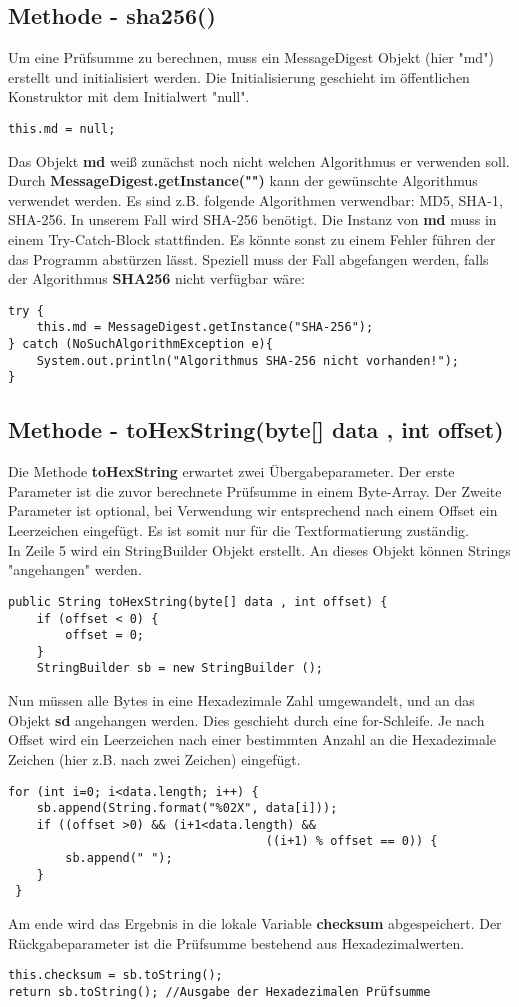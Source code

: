 \documentclass[12pt]{article}
\begin{document}
\subsection{Methode - sha256()}
Um eine Prüfsumme zu berechnen, muss ein MessageDigest Objekt (hier "md") erstellt und initialisiert werden. Die Initialisierung geschieht im öffentlichen Konstruktor mit dem Initialwert "null".
\begin{lstlisting}
this.md = null;
\end{lstlisting}	
Das Objekt \textbf{md} weiß zunächst noch nicht welchen Algorithmus er verwenden soll. Durch \textbf{MessageDigest.getInstance("")} kann der gewünschte Algorithmus verwendet werden. Es sind z.B. folgende Algorithmen verwendbar: MD5, SHA-1, SHA-256. In unserem Fall wird SHA-256 benötigt. Die Instanz von \textbf{md} muss in einem Try-Catch-Block stattfinden. Es könnte sonst zu einem Fehler führen der das Programm abstürzen lässt. Speziell muss der Fall abgefangen werden, falls der Algorithmus \textbf{SHA256} nicht verfügbar wäre:
\begin{lstlisting}
try {
	this.md = MessageDigest.getInstance("SHA-256");
} catch (NoSuchAlgorithmException e){
	System.out.println("Algorithmus SHA-256 nicht vorhanden!");
}
\end{lstlisting}
\newpage

\subsection{Methode - toHexString(byte[] data , int offset)}
Die Methode \textbf{toHexString} erwartet zwei Übergabeparameter. Der erste Parameter ist die zuvor berechnete Prüfsumme in einem Byte-Array. Der Zweite Parameter ist optional, bei Verwendung wir entsprechend nach einem Offset ein Leerzeichen eingefügt. Es ist somit nur für die Textformatierung zuständig.\\
In Zeile 5 wird ein StringBuilder Objekt erstellt. An dieses Objekt können Strings "angehangen" werden.
\begin{lstlisting}
public String toHexString(byte[] data , int offset) {
	if (offset < 0) {
		offset = 0;
	}
	StringBuilder sb = new StringBuilder ();
\end{lstlisting}	
Nun müssen alle Bytes in eine Hexadezimale Zahl umgewandelt, und an das Objekt \textbf{sd} angehangen werden. Dies geschieht durch eine for-Schleife. Je nach Offset wird ein Leerzeichen nach einer bestimmten Anzahl an die Hexadezimale Zeichen (hier z.B. nach zwei Zeichen) eingefügt.
\begin{lstlisting}
for (int i=0; i<data.length; i++) {
	sb.append(String.format("%02X", data[i]));
	if ((offset >0) && (i+1<data.length) && 
		                            ((i+1) % offset == 0)) {
		sb.append(" ");
	}
 }
\end{lstlisting}
Am ende wird das Ergebnis in die lokale Variable \textbf{checksum} abgespeichert. Der Rückgabeparameter ist die Prüfsumme bestehend aus Hexadezimalwerten.
\begin{lstlisting}
this.checksum = sb.toString();
return sb.toString(); //Ausgabe der Hexadezimalen Prüfsumme

\end{lstlisting}
\newpage
\end{document}
